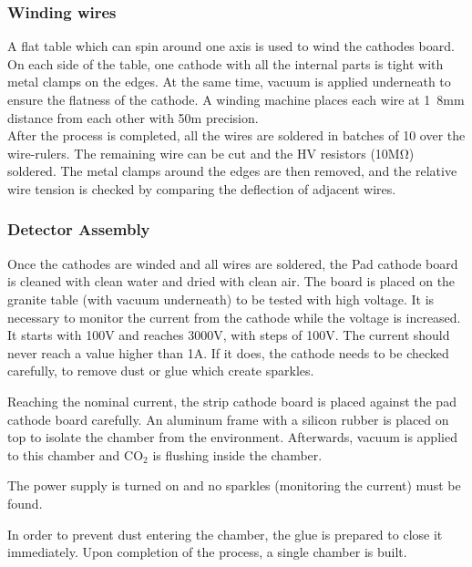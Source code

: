 \subsubsection{Winding wires}
A flat table which can spin around one axis is used to wind the cathodes board.
On each side of the table, one cathode with all the internal parts is tight with metal clamps on
the edges. 
At the same time, vacuum is applied underneath to ensure the flatness of the cathode. 
A winding machine places each wire at \unit{1.8}{mm} distance from each other with
\unit{50}{\micro m} precision.\\ 
After the process is completed, all the wires are soldered in batches of 10
over the wire-rulers. The remaining wire can be cut and the HV resistors (10\si{\mega\ohm}) soldered. The metal
clamps around the edges are then removed, and the relative wire tension is checked by comparing the deflection of
adjacent wires.\par

\subsubsection{Detector Assembly}

Once the cathodes are winded and all wires are soldered, the Pad cathode board is cleaned with clean water and dried
with clean air.  The board is placed on the granite table (with vacuum underneath) to be tested with high voltage.  It
is necessary to monitor the current from the cathode while the voltage is increased.  It starts with 100V and reaches
3000V, with steps of  100V.  The current should never reach a value higher than \unit{1}{\micro A}. If it does, the
cathode needs to be checked carefully, to remove dust or glue which create sparkles.\par

Reaching the nominal current, the strip cathode board is placed against the pad cathode board carefully.  An aluminum
frame with a silicon rubber is placed on top to isolate the chamber from the environment.  Afterwards, vacuum is applied
to this chamber and CO$_2$ is flushing inside the chamber.\par 

The power supply is turned on and no sparkles (monitoring the current) must be found.\par 

In order to prevent dust entering the chamber, the glue is prepared to close it immediately.  Upon completion of
the process, a single chamber is built.\par

